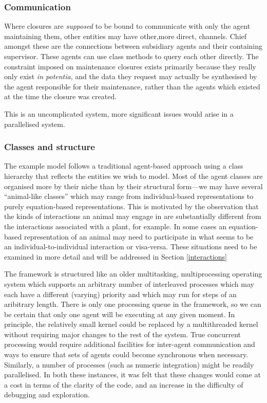 \subsubsection{Communication}

Where closures are \emph{supposed} to be bound to communicate with
only the agent maintaining them, other entities may have other,more
direct, channels. Chief amongst these are the connections between
subsidiary agents and their containing supervisor.  These agents can
use class methods to query each other directly. The constraint imposed
on maintenance closures exists primarily because they really only
exist \emph{in potentia}, and the data they request may actually be
synthesised by the agent responsible for their maintenance, rather
than the agents which existed at the time the closure was created.

This is an uncomplicated system, more significant issues would arise
in a parallelised system.  


\subsubsection{Classes and structure}

The example model follows a traditional agent-based approach using a
class hierarchy that reflects the entities we wish to model. Most of
the agent classes are organised more by their niche than by their
structural form---we may have several ``animal-like classes'' which
may range from individual-based representations to purely
equation-based representations. This is motivated by the observation
that the kinds of interactions an animal may engage in are
substantially different from the interactions associated with a plant,
for example.  In some cases an equation-based representation of an
animal may need to participate in what seems to be an
individual-to-individual interaction or visa-versa.  These situations
need to be examined in more detail and will be addressed in Section
\ref{interactions}


The framework is structured like an older multitasking,
multiprocessing operating system which supports an arbitrary number of
interleaved processes which may each have a different (varying)
priority and which may run for steps of an aribitrary length. There is
only one processing queue in the framework, so we can be certain that
only one agent will be executing at any given moment.  In principle,
the relatively small kernel could be replaced by a multithreaded
kernel without requiring major changes to the rest of the system. True
concurrent processing would require additional facilities for
inter-agent communication and ways to ensure that sets of agents could
become synchronous when necessary. Similarly, a number of processes
(such as numeric integration) might be readily parallelised.  In both
these instances, it was felt that these changes would come at a cost
in terms of the clarity of the code, and an increase in the difficulty
of debugging and exploration.

